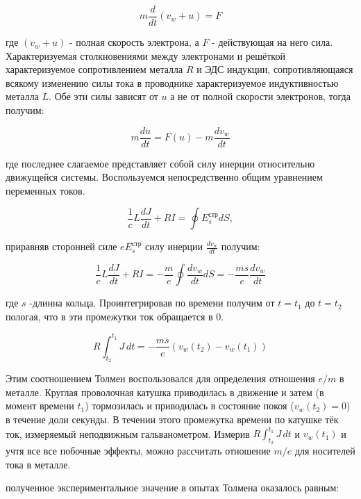 \documentclass{lab}
\begin{document}
\begin{equation}
    m \frac{d}{dt} (v_{w} + u) = F
\end{equation}

где $(v_{w} + u)$ - полная скорость электрона, а $F$ - действующая на него сила. Характеризуемая столкновениями между электронами и решёткой характеризуемое сопротивлением металла $R$ и ЭДС индукции, сопротивляющаяся всякому изменению силы тока в проводнике характеризуемое индуктивностью металла $L$. Обе эти силы зависят от $u$ а не от полной скорости электронов, тогда получим:

\begin{equation}
    m \frac{du}{dt}  = F(u) - m \frac{dv_{w}}{dt}
\end{equation}

где последнее слагаемое представляет собой силу инерции относительно движущейся системы. Воспользуемся непосредственно общим уравнением переменных токов.

\begin{equation}
    \frac{1}{c}L\frac{dJ}{dt} +RI  = \oint{E^{\text{стр}}_{s}}dS,
\end{equation}

приравняв сторонней силе $ eE^{\text{стр}}_{s}$ силу инерции $\frac{dv_{w}}{dt}$ получим:

\begin{equation}
    \frac{1}{c}L\frac{dJ}{dt} +RI  = - \frac{m}{e} \oint{\frac{dv_{w}}{dt}}dS = - \frac{ms}{e} \frac{dv_{w}}{dt}
\end{equation}

где $s$ -длинна кольца. Проинтегрировав по времени получим от $t = t_1$ до $t = t_2$ пологая, что в эти промежутки ток обращается в 0.

\begin{equation}
    R\int_{t_2}^{t_1} J \,dt = - \frac{ms}{e} (v_{w}(t_2) - v_{w}(t_1))
\end{equation}

Этим соотношением Толмен воспользовался для определения отношения $e/m$ в металле. Круглая проволочная катушка приводилась в движение и затем (в момент времени $t_1$) тормозилась и приводилась в состояние покоя ($v_{w}(t_2) = 0$) в течение доли секунды. В течении этого промежутка времени по катушке тёк ток, измеряемый неподвижным гальванометром. Измерив $R\int_{t_2}^{t_1} J \,dt$ и $v_{w}(t_1)$ и учтя все все побочные эффекты, можно рассчитать отношение $m/e$ для носителей тока в металле.

полученное экспериментальное значение в опытах Толмена оказалось равным:
\end{document}
